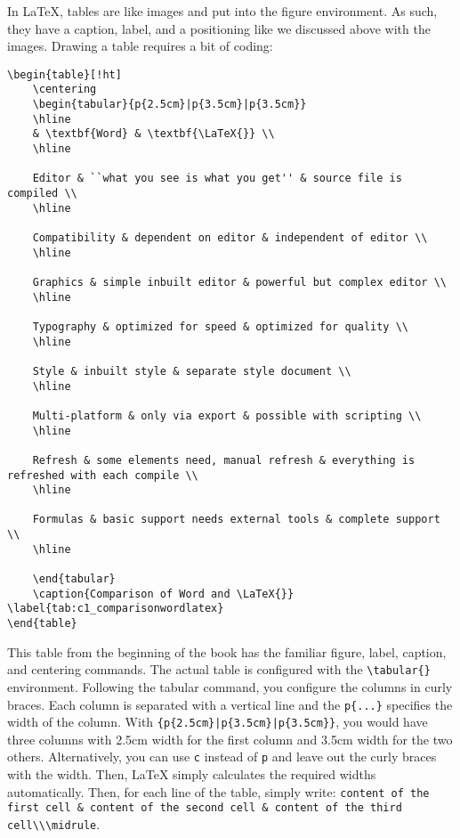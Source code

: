 In \LaTeX{}, tables are like images and put into the figure environment. As
such, they have a caption, label, and a positioning like we discussed above with
the images. Drawing a table requires a bit of coding:
\begin{lstlisting}[language=Tex]
\begin{table}[!ht]
    \centering
    \begin{tabular}{p{2.5cm}|p{3.5cm}|p{3.5cm}}
    \hline
    & \textbf{Word} & \textbf{\LaTeX{}} \\ 
    \hline
    
    Editor & ``what you see is what you get'' & source file is compiled \\
    \hline
    
    Compatibility & dependent on editor & independent of editor \\
    \hline
    
    Graphics & simple inbuilt editor & powerful but complex editor \\
    \hline
    
    Typography & optimized for speed & optimized for quality \\
    \hline
    
    Style & inbuilt style & separate style document \\
    \hline
    
    Multi-platform & only via export & possible with scripting \\
    \hline
    
    Refresh & some elements need, manual refresh & everything is refreshed with each compile \\
    \hline
    
    Formulas & basic support needs external tools & complete support \\
    \hline
    
    \end{tabular}
    \caption{Comparison of Word and \LaTeX{}} \label{tab:c1_comparisonwordlatex}
\end{table}
\end{lstlisting}

This table from the beginning of the book has the familiar figure, label,
caption, and centering commands. The actual table is configured with the
\lstinline[language=Tex]!\tabular{}! environment. Following the tabular command,
you configure the columns in curly braces. Each column is separated with a
vertical line and the \lstinline[language=Tex]!p{...}! %
specifies the width of the column. With
\lstinline[language=Tex]!{p{2.5cm}|p{3.5cm}|p{3.5cm}}!, you would have three
columns with 2.5cm width for the first column and 3.5cm width for the two
others. Alternatively, you can use \lstinline[language=Tex]!c! instead of
\lstinline[language=Tex]!p! and leave out the curly braces with the width. Then,
\LaTeX{} simply calculates the required widths automatically. Then, for each
line of the table, simply write: 
\lstinline[language=Tex]!content of the first cell & content of the second cell & content of the third cell\\\midrule!.

